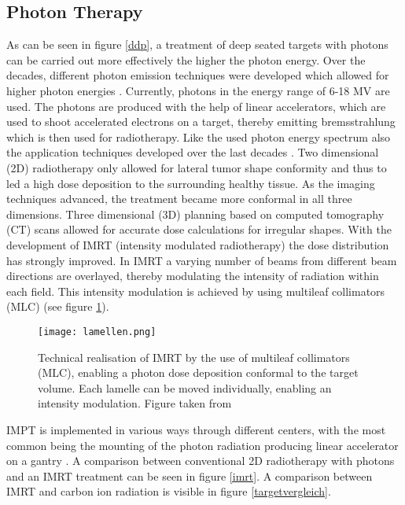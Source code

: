 \documentclass[type=dr, dr=rernat, accentcolor=tud7b,colorbacktitle, bigchapter, openright, twoside, 12pt ]{tudthesis}
\begin{document}
\subsection{Photon Therapy}

As can be seen in figure \ref{ddp}, a treatment of deep seated targets with photons can be carried out more effectively the higher the photon 
energy. Over the decades, different photon emission techniques were developed which allowed for higher photon energies \cite{Lue12}. 
Currently, photons in the energy range of 6-18 MV \cite{Ber06} are used. The photons are produced with the help of linear accelerators, which 
are used to shoot accelerated electrons on a target, thereby emitting bremsstrahlung which is then used for radiotherapy.\newline
\newline
Like the used photon energy spectrum also the application techniques developed over the last decades \cite{Buc05}. Two dimensional (2D) 
radiotherapy only allowed for lateral tumor shape conformity and thus to led a high dose deposition to the surrounding healthy tissue. As the 
imaging techniques advanced, the treatment became more conformal in all three dimensions. Three dimensional (3D) planning based on computed 
tomography (CT) scans allowed for accurate dose calculations for irregular shapes. With the development of IMRT (intensity modulated 
radiotherapy) the dose distribution has strongly improved. In IMRT a varying number of beams from different beam directions are overlayed, 
thereby modulating the intensity of radiation within each field. This intensity modulation is achieved by using multileaf collimators (MLC) 
(see figure \ref{lamellen}). 

\begin{figure}[H]
\begin{center}
\texttt{[image: lamellen.png]}
\caption{Technical realisation of IMRT by the use of multileaf collimators (MLC), enabling a photon dose deposition conformal to the 
target volume. Each lamelle can be moved individually, enabling an intensity modulation. Figure taken from \cite{Sch01}}
\label{lamellen}
\end{center}
\end{figure}

IMPT is implemented in various ways through different centers, with the most common being the mounting of the 
photon radiation producing linear accelerator on a gantry \cite{Lue12}. A comparison between conventional 2D radiotherapy with photons 
and an IMRT treatment can be seen in figure \ref{imrt}. A comparison between IMRT and carbon ion radiation is visible in figure 
\ref{targetvergleich}.
\end{document}
